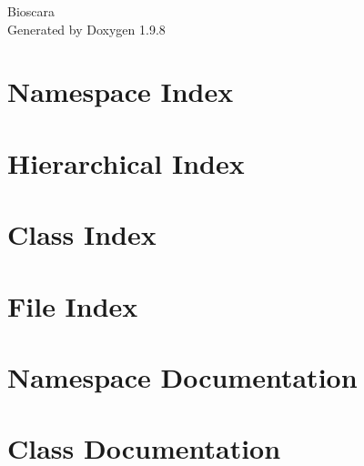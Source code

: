 \documentclass[twoside]{book}
\newcommand{\+}{\discretionary{\mbox{\scriptsize$\hookleftarrow$}}{}{}}
\newcommand{\clearemptydoublepage}{%
    \newpage{\pagestyle{empty}\cleardoublepage}%
  }
\begin{document}
  \raggedbottom
    \hypersetup{pageanchor=false,
                bookmarksnumbered=true,
                pdfencoding=unicode
               }
  \begin{titlepage}
  \vspace*{7cm}
  \begin{center}%
  {\Large Bioscara}\\
  \vspace*{1cm}
  {\large Generated by Doxygen 1.9.8}\\
  \end{center}
  \end{titlepage}
  \clearemptydoublepage
  \tableofcontents
  \clearemptydoublepage
  \hypersetup{pageanchor=true}


\chapter{Namespace Index}

\chapter{Hierarchical Index}

\chapter{Class Index}

\chapter{File Index}

\chapter{Namespace Documentation}




\chapter{Class Documentation}
















\end{document}

